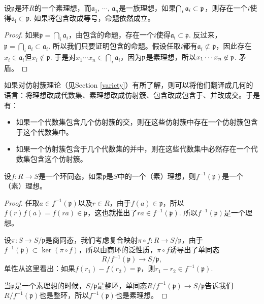 \begin{pro} \label{primeau}设$\mathfrak{p}$是环$R$的一个素理想，而$\mathfrak{a}_1$, $\cdots$, $\mathfrak{a}_n$是一族理想，如果$\bigcap_i \mathfrak{a}_i\subset \mathfrak{p}$，则存在一个$i$使得$\mathfrak{a_i}\subset \mathfrak{p}$. 如果将包含改成等号，命题依然成立。
\end{pro}

\begin{proof}
	如果$\mathfrak{p}=\bigcap_i \mathfrak{a}_i$，由包含的命题，存在一个$i$使得$\mathfrak{a_i}\subset \mathfrak{p}$. 反过来，$\mathfrak{p}=\bigcap_i \mathfrak{a}_i\subset \mathfrak{a}_i$. 所以我们只要证明包含的命题。假设任取$i$都有$\mathfrak{a}_i\not\subset \mathfrak{p}$，因此存在$x_i\in\mathfrak{a}_i$但$x_i\not\in \mathfrak{p}$. 于是对$x_1\cdots x_n\in \bigcap_{i} \mathfrak{a}_i$，因为$\mathfrak{p}$是素理想，所以$x_1\cdots x_n\not\in \mathfrak{p}$. 矛盾。
\end{proof}

\para 如果对仿射簇理论（见Section \ref{variety}）有所了解，则可以将他们翻译成几何的语言：将理想改成代数集、素理想改成仿射簇、包含改成包含于、并改成交。于是有：
\begin{itemize}
\item 如果一个代数集包含几个仿射簇的交，则在这些仿射簇中存在一个仿射簇包含于这个代数集中。
\item 如果一个仿射簇包含于几个代数集的并中，则在这些代数集中必然存在一个代数集包含这个仿射簇。
\end{itemize}

\para 设$f:R\to S$是一个环同态，如果$\mathfrak{p}$是$S$中的一个（素）理想，则$f^{-1}(\mathfrak{p})$是一个（素）理想。

\begin{proof}
	任取$a\in f^{-1}(\mathfrak{p})$以及$r\in R$，由于$f(a)\in \mathfrak{p}$，所以$f(r)f(a)=f(ra)\in \mathfrak{p}$，这也就推出了$ra\in f^{-1}(\mathfrak{p})$. 所以$f^{-1}(\mathfrak{p})$是一个理想。

	设$\pi:S\to S/\mathfrak{p}$是商同态，我们考虑复合映射$\pi\circ f:R\to S/\mathfrak{p}$，由于$f^{-1}(\mathfrak{p})\subset \ker(\pi\circ f)$，所以由商环的泛性质，$\pi\circ f$诱导出了单同态\[R/f^{-1}(\mathfrak{p})\to S/\mathfrak{p},\]
	单性从这里看出：如果$f(r_1)-f(r_2)=\mathfrak{p}$，则$r_1-r_2\in f^{-1}(\mathfrak{p})$. 

	当$\mathfrak{p}$是一个素理想的时候，$S/\mathfrak{p}$是整环，单同态$R/f^{-1}(\mathfrak{p})\to S/\mathfrak{p}$告诉我们$R/f^{-1}(\mathfrak{p})$也是整环，所以$f^{-1}(\mathfrak{p})$也是素理想。
\end{proof}

